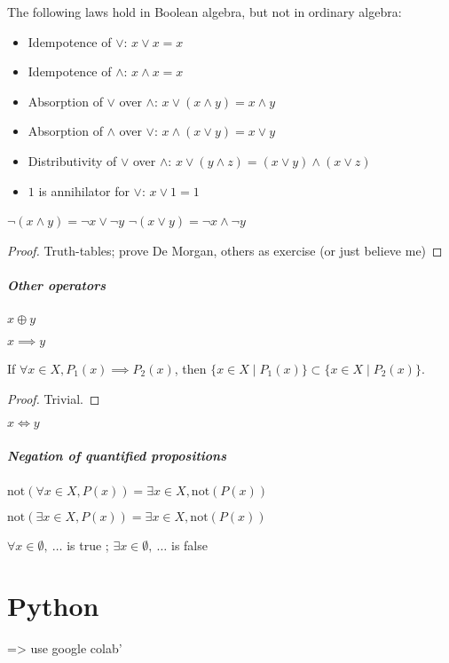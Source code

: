 \begin{property}
	The following laws hold in Boolean algebra, but not in ordinary algebra: 
	\begin{itemize}
		\item Idempotence of $\lor$: $x \lor x = x$
		\item Idempotence of $\land$: $x \land x = x$
		\item Absorption of $\lor$ over $\land$: $x \lor (x \land y)  = x \land y$
		\item Absorption of $\land$ over $\lor$: $x \land (x \lor y)  = x \lor y$
		\item Distributivity of $\lor$ over $\land$:  $x \lor (y \land z) = (x \lor y) \land (x \lor z)$
		\item $1$ is annihilator for $\lor$: $x \lor 1 = 1$
	\end{itemize}
\end{property}
\begin{property}
	$\lnot (x \land y) = \lnot x \lor \lnot y$
	$\lnot (x \lor y) = \lnot x \land \lnot y$
\end{property}
\begin{proof}
	Truth-tables; prove De Morgan, others as exercise (or just believe me)
\end{proof}

\subparagraph{Other operators}
\begin{definition}[Exclusive Or]
	$x \oplus y$
\end{definition}
\begin{definition}[Implication]
	$x \implies y$
\end{definition}
\begin{property}
	If $\forall x \in X, P_1(x) \implies P_2(x)$, then $\{ x \in X \mid P_1(x) \} \subset \{ x \in X \mid P_2(x) \}$.
\end{property}
\begin{proof}
	Trivial.
\end{proof}
\begin{definition}
	$x \iff y$
\end{definition}

\subparagraph{Negation of quantified propositions}
\begin{property}
	$\mathrm{not}(\forall x\in X, P(x)) = \exists x\in X, \mathrm{not}(P(x))$
\end{property}
\begin{property}
	$\mathrm{not}(\exists x\in X, P(x)) = \exists x\in X, \mathrm{not}(P(x))$
\end{property}
\begin{notation}
	$\forall x \in \emptyset, \ \dots$ is true ;
	$\exists x \in \emptyset, \ \dots$ is false
\end{notation}



\section{Python}
=> use google colab'


